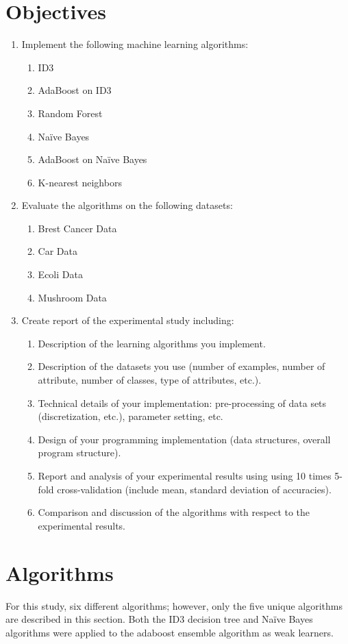 \documentclass[11pt]{article}
\begin{document}
\section{Objectives}
\begin{enumerate}
  \item Implement the following machine learning algorithms:
  \begin{enumerate}
    \item ID3
    \item AdaBoost on ID3
    \item Random Forest
    \item Naïve Bayes
    \item AdaBoost on Naïve Bayes
    \item K-nearest neighbors
  \end{enumerate}
  \item Evaluate the algorithms on the following datasets:
  \begin{enumerate}
    \item Brest Cancer Data
    \item Car Data
    \item Ecoli Data
    \item Mushroom Data
  \end{enumerate}
  \item Create report of the experimental study including:
  \begin{enumerate}
    \item Description of the learning algorithms you implement.
    \item Description of the datasets you use (number of examples, number of attribute, number of classes, type of attributes, etc.).
    \item Technical details of your implementation: pre-processing of data sets (discretization, etc.), parameter setting, etc.
    \item Design of your programming implementation (data structures, overall program structure).
    \item Report and analysis of your experimental results using using 10 times 5-fold cross-validation (include mean, standard deviation of accuracies).
    \item Comparison and discussion of the algorithms with respect to the experimental results.
  \end{enumerate}
\end{enumerate}

\section{Algorithms}
For this study, six different algorithms; however, only the five unique algorithms are described in this section. Both the ID3 decision tree and Naïve Bayes algorithms were applied to the adaboost ensemble algorithm as weak learners.
\end{document}
